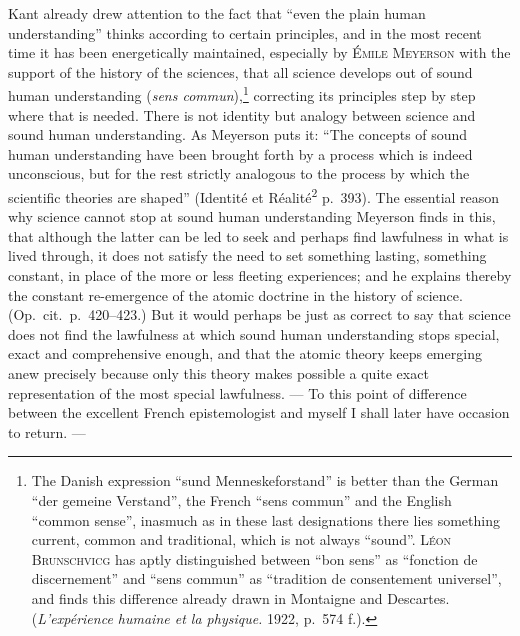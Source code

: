 \documentclass[12pt]{book}
\newcommand{\opage}[1]{\marginnote{\footnotesize\textit{[#1]}}}
\begin{document}
Kant already drew attention to the fact that ``even the plain human
understanding'' thinks according to certain principles, and in the most recent
time it has been energetically maintained, especially by \textsc{Émile
Meyerson} with the support of the history of the sciences, that all science
develops out of sound human understanding (\textit{sens
commun}),\footnote{The Danish expression ``sund Menneskeforstand'' is better than
the German ``der gemeine Verstand'', the French ``sens commun'' and the English
``common sense'', inasmuch as in these last designations there lies something
current, common and traditional, which is not always ``sound''. \textsc{Léon
Brunschvicg} has aptly distinguished between ``bon sens'' as ``fonction de
discernement'' and ``sens commun'' as ``tradition de consentement universel'', and
finds this difference already drawn in Montaigne and Descartes.
(\textit{L'expérience humaine et la physique.} 1922, p.\ 574 f.).} correcting its
principles step by step where that is needed. There is not identity but analogy
between science and sound human understanding. As Meyerson puts it: ``The
concepts of sound human understanding have been brought forth by a process which
is indeed unconscious, but for the rest strictly analogous to the process by
which the scientific theories are shaped'' (Identité et
Réalité\textsuperscript{2} p.\ 393). The essential reason why science cannot stop
at sound human understanding Meyerson finds in this, that although the latter can
be led to seek and perhaps find lawfulness in what is lived through, it does not
satisfy the need to set something lasting, something constant, in place of the
more or less fleeting experiences; and he explains thereby the constant
re-emergence of the atomic doctrine in the history of science. (Op.\ cit.\ p.\
420--423.) But it would perhaps be just as correct to say that science does not
find the lawfulness at which sound human understanding stops special, exact and
comprehensive enough, and that the atomic theory keeps emerging anew precisely
\opage{69}because only this theory makes possible a quite exact representation of the most
special lawfulness. --- To this point of difference between the excellent French
epistemologist and myself I shall later have occasion to return. ---
\end{document}
